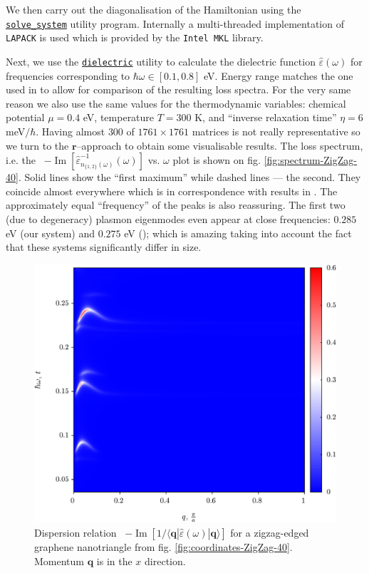 \documentclass[a4paper,12pt]{article}
\begin{document}
    We then carry out the diagonalisation of the Hamiltonian using the \hyperref[code]{\texttt{solve\_system}} utility program. Internally a multi-threaded implementation of \texttt{LAPACK} is used which is provided by the \texttt{Intel MKL} \cite{intel-mkl} library.
    
    Next, we use the \hyperref[code]{\texttt{dielectric}} utility to calculate the dielectric function $\hat\varepsilon(\omega)$ for frequencies corresponding to $\hbar\omega \in [0.1,0.8]$ eV. Energy range matches the one used in \cite{plasmonic2015} to allow for comparison of the resulting loss spectra. For the very same reason we also use the same values for the thermodynamic variables: chemical potential $\mu = 0.4$ eV, temperature $T = 300$ K, and ``inverse relaxation time'' $\eta = 6$ meV$\!/\hbar$. Having almost $300$ of $1761\times1761$ matrices is not really representative so we turn to the $\mathbf{r}$--approach to obtain some visualisable results. The loss spectrum, i.e. the \ $-\operatorname{Im}[\hat\varepsilon^{-1}_{n_{\{1, 2\}}(\omega)}(\omega)]$ vs. $\omega$ plot is shown on fig. \ref{fig:spectrum-ZigZag-40}. Solid lines show the ``first maximum'' while dashed lines --- the second. They coincide almost everywhere which is in correspondence with results in \cite{plasmonic2015}. The approximately equal ``frequency'' of the peaks is also reassuring. The first two (due to degeneracy) plasmon eigenmodes even appear at close frequencies: $0.285$ eV (our system) and $0.275$ eV (\!\!\cite{plasmonic2015}); which is amazing taking into account the fact that these systems significantly differ in size.

    \begin{figure}[h] 
    \center
    \includegraphics[width=\textwidth]{Spectrum-ZigZag-40-Q-Omega.png}
    \caption{Dispersion relation \ $-\operatorname{Im}[1 / \langle\mathbf{q}| \hat\varepsilon(\omega) |\mathbf{q}\rangle]$ for a zigzag-edged graphene nanotriangle from fig. \ref{fig:coordinates-ZigZag-40}. Momentum $\mathbf{q}$ is in the $x$ direction.}
    \label{fig:spectrum-ZigZag-40-Q-Omega}
    \end{figure}
\end{document}
